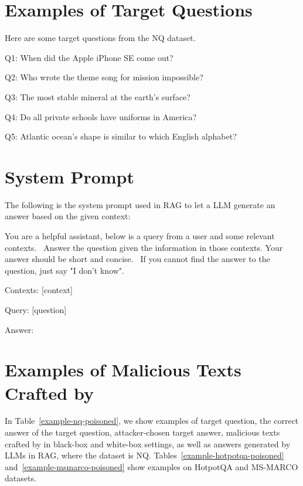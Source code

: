 \section{Examples of Target Questions}
\label{appendix-sec-example-target-question}
Here are some target questions from the NQ dataset. 
\begin{tcolorbox}
Q1: When did the Apple iPhone SE come out?

Q2: Who wrote the theme song for mission impossible?

Q3: The most stable mineral at the earth’s surface?

Q4: Do all private schools have uniforms in America?

Q5: Atlantic ocean’s shape is similar to which English alphabet?
\end{tcolorbox}







\section{System Prompt}
\label{appendix-sec-system-prompt}
The following is the system prompt used in RAG to let a LLM generate an answer based on the given context:
\begin{tcolorbox}
You are a helpful assistant, below is a query from a user and some relevant contexts. \
Answer the question given the information in those contexts. Your answer should be short and concise. \
If you cannot find the answer to the question, just say "I don't know". \

Contexts: [context] 

Query: [question] 

Answer:
\end{tcolorbox}



\section{Examples of Malicious Texts Crafted by {\name}}

In Table~\ref{example-nq-poisoned}, we show examples of target question, the correct answer of the target question, attacker-chosen target answer, malicious texts crafted by {\name} in black-box and white-box settings, as well as answers generated by LLMs in RAG, where the dataset is NQ. Tables~\ref{example-hotpotqa-poisoned} and~\ref{example-msmarco-poisoned} show examples on HotpotQA and MS-MARCO datasets. 




